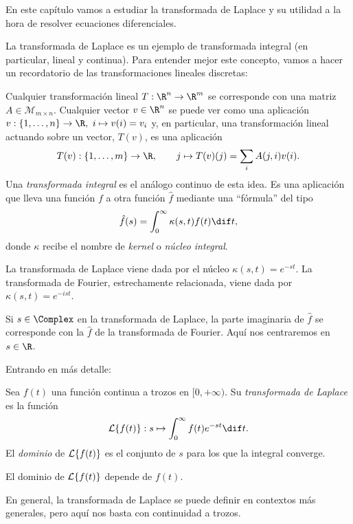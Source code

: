 \documentclass[../main.tex]{subfiles}
\begin{document}
En este capítulo vamos a estudiar la transformada de Laplace y su utilidad a la
hora de resolver ecuaciones diferenciales.

La transformada de Laplace es un ejemplo de transformada integral (en
particular, lineal y continua). Para entender mejor este concepto, vamos a
hacer un recordatorio de las transformaciones lineales discretas:

Cualquier transformación lineal \(T : \R^n \to \R^m\) se corresponde con una
matriz \(A \in \mathcal{M}_{m \times n}\). Cualquier vector \(v \in \R^n\) se
puede ver como una aplicación
\(v : \{1, \dots, n\} \to \R,\ i \mapsto v(i) = v_i\) y, en particular, una
transformación lineal actuando sobre un vector, \(T(v)\), es una aplicación
\[T(v) : \{1, \dots, m\} \to \R, \qquad j \mapsto T(v)(j) = \sum_i A(j,i)v(i).\]
Una \emph{transformada integral} es el análogo continuo de esta idea. Es una
aplicación que lleva una función \(f\) a otra función \(\hat{f}\) mediante una
``fórmula'' del tipo
\[\hat{f}(s) = \int_0^\infty \kappa(s,t) f(t) \dif t,\]
donde \(\kappa\) recibe el nombre de \emph{kernel} o \emph{núcleo integral}.

La transformada de Laplace viene dada por el núcleo \(\kappa(s,t) =
e^{-st}\). La transformada de Fourier, estrechamente relacionada, viene dada por
\(\kappa(s,t) = e^{-ist}\).

\begin{remark}
  Si \(s \in \Complex\) en la transformada de Laplace, la parte imaginaria de
  \(\hat{f}\) se corresponde con la \(\hat{f}\) de la transformada de
  Fourier. Aquí nos centraremos en \(s \in \R\).
\end{remark}

Entrando en más detalle:

\begin{definition}
  Sea \(f(t)\) una función continua a trozos en \([0,+\infty)\). Su
  \emph{transformada de Laplace} es la función
  \[\L\{f(t)\} : s \mapsto \int_0^\infty f(t)e^{-st} \dif t.\]
  El \emph{dominio} de \(\mathcal{L}\{f(t)\}\) es el conjunto de \(s\) para los que la
  integral converge.
\end{definition}

\begin{remark}
  El dominio de \(\mathcal{L}\{f(t)\}\) depende de \(f(t)\).
\end{remark}

\begin{remark}
  En general, la transformada de Laplace se puede definir en contextos más
  generales, pero aquí nos basta con continuidad a trozos.
\end{remark}
\end{document}
